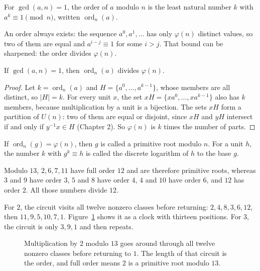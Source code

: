 \begin{definisi}
For $\gcd(a,n)=1$, the order of $a$ modulo $n$ is the least natural number $k$ with
$a^k\equiv1\pmod n$, written $\operatorname{ord}_n(a)$.
\end{definisi}

An order always exists: the sequence $a^0,a^1,\dots$ has only $\varphi(n)$ distinct values, so two of
them are equal and $a^{i-j}\equiv1$ for some $i>j$. That bound can be sharpened: the order divides
$\varphi(n)$.

\begin{lemma}
If $\gcd(a,n)=1$, then $\operatorname{ord}_n(a)$ divides $\varphi(n)$.
\end{lemma}

\begin{proof}
Let $k=\operatorname{ord}_n(a)$ and $H=\{a^0,\dots,a^{k-1}\}$, whose members are all distinct, so
$|H|=k$. For every unit $x$, the set $xH=\{xa^0,\dots,xa^{k-1}\}$ also has $k$ members, because
multiplication by a unit is a bijection. The sets $xH$ form a partition of $U(n)$: two of them are
equal or disjoint, since $xH$ and $yH$ intersect if and only if $y^{-1}x\in H$ (Chapter 2). So
$\varphi(n)$ is $k$ times the number of parts.
\end{proof}

\begin{definisi}
If $\operatorname{ord}_n(g)=\varphi(n)$, then $g$ is called a primitive root modulo $n$. For a unit
$h$, the number $k$ with $g^k\equiv h$ is called the discrete logarithm of $h$ to the base $g$.
\end{definisi}

Modulo $13$, $2,6,7,11$ have full order $12$ and are therefore primitive roots, whereas $3$ and $9$
have order $3$, $5$ and $8$ have order $4$, $4$ and $10$ have order $6$, and $12$ has order $2$. All
those numbers divide $12$.

For $2$, the circuit visits all twelve nonzero classes before returning: $2,4,8,3,6,12$, then
$11,9,5,10,7,1$. Figure~\ref{fig:jam} shows it as a clock with thirteen positions. For $3$, the
circuit is only $3,9,1$ and then repeats.

\begin{figure}[htbp]
\centering
{}
\caption{Multiplication by $2$ modulo $13$ goes around through all twelve nonzero classes before
returning to $1$. The length of that circuit is the order, and full order means $2$ is a primitive
root modulo $13$.}
\label{fig:jam}
\end{figure}

